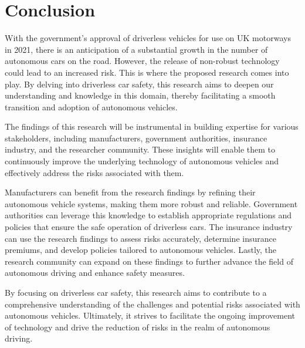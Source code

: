\documentclass[a4paper]{article}
\begin{document}
\pagebreak


\section{Conclusion}
With the government's approval of driverless vehicles for use on UK motorways in 2021, there is an anticipation of a substantial growth in the number of autonomous cars on the road. However, the release of non-robust technology could lead to an increased risk. This is where the proposed research comes into play. By delving into driverless car safety, this research aims to deepen our understanding and knowledge in this domain, thereby facilitating a smooth transition and adoption of autonomous vehicles.

\vspace{0.25cm}

The findings of this research will be instrumental in building expertise for various stakeholders, including manufacturers, government authorities, insurance industry, and the researcher community. These insights will enable them to continuously improve the underlying technology of autonomous vehicles and effectively address the risks associated with them.

\vspace{0.25cm}
Manufacturers can benefit from the research findings by refining their autonomous vehicle systems, making them more robust and reliable. Government authorities can leverage this knowledge to establish appropriate regulations and policies that ensure the safe operation of driverless cars. The insurance industry can use the research findings to assess risks accurately, determine insurance premiums, and develop policies tailored to autonomous vehicles. Lastly, the research community can expand on these findings to further advance the field of autonomous driving and enhance safety measures.

\vspace{0.25cm}
By focusing on driverless car safety, this research aims to contribute to a comprehensive understanding of the challenges and potential risks associated with autonomous vehicles. Ultimately, it strives to facilitate the ongoing improvement of technology and drive the reduction of risks in the realm of autonomous driving.  

\pagebreak


\end{document}
